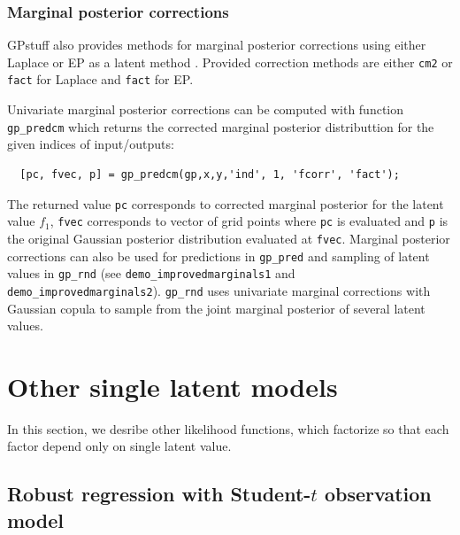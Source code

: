 \documentclass[twoside,11pt]{article}
\newcommand{\pkg}[1]{{\fontseries{b}\selectfont #1}}
\begin{document}
\subsubsection{Marginal posterior corrections}

\pkg{GPstuff} also provides methods for marginal posterior corrections using either Laplace or EP as a latent method \citep{Cseke+Heskes:2011}. Provided correction methods are either \texttt{cm2} or \texttt{fact} for Laplace and \texttt{fact} for EP. 

Univariate marginal posterior corrections can be computed with function \texttt{gp\_predcm} which returns the corrected marginal posterior distributtion for the given indices of input/outputs:
\begin{verbatim}
  [pc, fvec, p] = gp_predcm(gp,x,y,'ind', 1, 'fcorr', 'fact');
\end{verbatim}
The returned value \texttt{pc} corresponds to corrected marginal posterior for the latent value $f_1$, \texttt{fvec} corresponds to vector of grid points where \texttt{pc} is evaluated and \texttt{p} is the original Gaussian posterior distribution evaluated at \texttt{fvec}. Marginal posterior corrections can also be used for predictions in \texttt{gp\_pred} and sampling of latent values in \texttt{gp\_rnd} (see \texttt{demo\_improvedmarginals1} and \texttt{demo\_improvedmarginals2}). \texttt{gp\_rnd} uses univariate marginal corrections with Gaussian copula to sample from the joint marginal posterior of several latent values.

\section{Other single latent models}


In this section, we desribe other likelihood functions, which
factorize so that each factor depend only on single latent value.
 
\subsection{Robust regression with Student-$t$ observation model}
\end{document}
